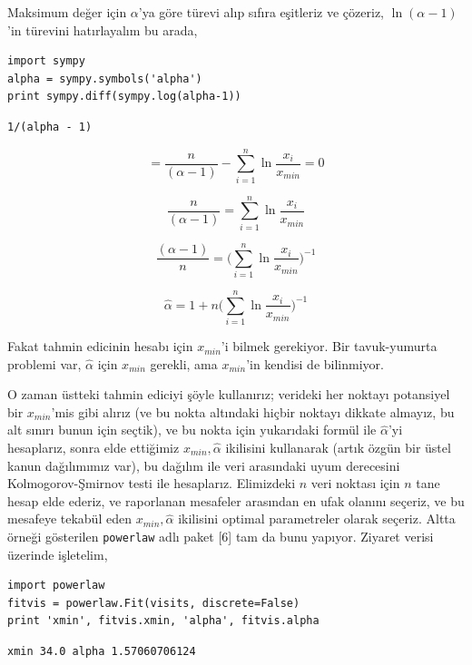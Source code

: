 \documentclass[12pt,fleqn]{article}\usepackage{../../common}
\begin{document}
Maksimum değer için $\alpha$'ya göre türevi alıp sıfıra eşitleriz ve
çözeriz, $\ln(\alpha-1)$'in türevini hatırlayalım bu arada,

\begin{verbatim}
import sympy
alpha = sympy.symbols('alpha')
print sympy.diff(sympy.log(alpha-1))
\end{verbatim}

\begin{verbatim}
1/(alpha - 1)
\end{verbatim}

$$ =  \frac{n}{(\alpha - 1)} - \sum _{i=1}^{n}  \ln \frac{x_i}{x_{min}}  = 0 $$

$$  \frac{n}{(\alpha - 1)} = \sum _{i=1}^{n}  \ln \frac{x_i}{x_{min}}   $$

$$ \frac{(\alpha - 1)}{n} =  \bigg( \sum _{i=1}^{n}  \ln \frac{x_i}{x_{min}} \bigg)^{-1}  $$

$$ \hat{\alpha} =  1 + n  \bigg( \sum _{i=1}^{n}  \ln \frac{x_i}{x_{min}} \bigg)^{-1}   $$

Fakat tahmin edicinin hesabı için $x_{min}$'i bilmek gerekiyor. Bir
tavuk-yumurta problemi var, $\hat{\alpha}$ için $x_{min}$ gerekli, ama
$x_{min}$'in kendisi de bilinmiyor. 

O zaman üstteki tahmin ediciyi şöyle kullanırız; verideki her noktayı potansiyel
bir $x_{min}$'mis gibi alırız (ve bu nokta altındaki hiçbir noktayı dikkate
almayız, bu alt sınırı bunun için seçtik), ve bu nokta için yukarıdaki formül
ile $\hat{\alpha}$'yi hesaplarız, sonra elde ettiğimiz $x_{min}, \hat{\alpha}$
ikilisini kullanarak (artık özgün bir üstel kanun dağılımımız var), bu dağılım
ile veri arasındaki uyum derecesini Kolmogorov-Şmirnov testi ile
hesaplarız. Elimizdeki $n$ veri noktası için $n$ tane hesap elde ederiz, ve
raporlanan mesafeler arasından en ufak olanını seçeriz, ve bu mesafeye tekabül
eden $x_{min},\hat{\alpha}$ ikilisini optimal parametreler olarak seçeriz. Altta
örneği gösterilen \verb!powerlaw!  adlı paket [6] tam da bunu yapıyor. Ziyaret
verisi üzerinde işletelim,

\begin{verbatim}
import powerlaw
fitvis = powerlaw.Fit(visits, discrete=False)
print 'xmin', fitvis.xmin, 'alpha', fitvis.alpha
\end{verbatim}

\begin{verbatim}
xmin 34.0 alpha 1.57060706124
\end{verbatim}
\end{document}
